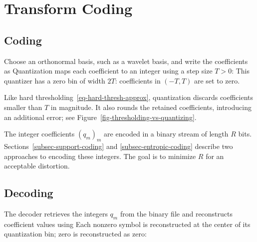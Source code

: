 \section{Transform Coding}
\label{sec-transform-coding}

                                                                 
\subsection{Coding}

Choose an orthonormal basis, such as a wavelet basis, and write the coefficients as
Quantization maps each coefficient to an integer using a step size $T>0$:
This quantizer has a zero bin of width $2T$: coefficients in $(-T,T)$ are set to zero.

Like hard thresholding~\eqref{eq-hard-thresh-approx}, quantization discards coefficients smaller than $T$ in magnitude. It also rounds the retained coefficients, introducing an additional error; see Figure~\ref{fig-thresholding-vs-quantizing}.


The integer coefficients $(q_m)_m$ are encoded in a binary stream of length $R$ bits.
Sections~\ref{subsec-support-coding} and \ref{subsec-entropic-coding} describe two approaches to encoding these integers. The goal is to minimize $R$ for an acceptable distortion.

                                                                 
\subsection{Decoding}

The decoder retrieves the integers $q_m$ from the binary file and reconstructs coefficient values using
Each nonzero symbol is reconstructed at the center of its quantization bin; zero is reconstructed as zero:
\begin{center}
\end{center}

